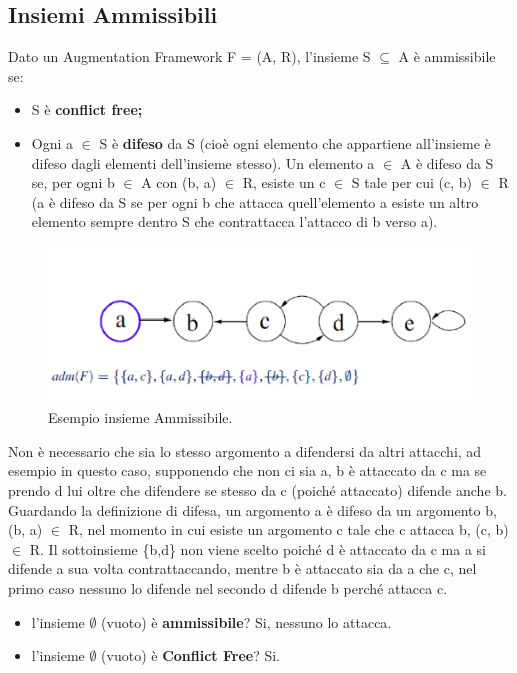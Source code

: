 \subsection{Insiemi Ammissibili}
Dato un Augmentation Framework F = (A, R), l'insieme S $\subseteq$ A è
ammissibile se:
\begin{itemize}
    \item S è \textbf{conflict free;}
    \item Ogni a $\in$ S è \textbf{difeso} da S (cioè ogni elemento che
          appartiene all'insieme è difeso dagli elementi dell'insieme stesso). Un
          elemento a $\in$ A è difeso da S se, per ogni b $\in$ A con (b, a) $\in$ R,
          esiste un c $\in$ S tale per cui (c, b) $\in$ R (a è difeso da S se per ogni
          b che attacca quell'elemento a esiste un altro elemento sempre dentro S che
          contrattacca l'attacco di b verso a).
\end{itemize}

\begin{figure}[H]
    \centering
    \includegraphics[width=12cm, keepaspectratio]{img/Cap6/ammissibile.png}
    \caption{Esempio insieme Ammissibile.}
\end{figure}

Non è necessario che sia lo stesso argomento a difendersi da altri attacchi, ad
esempio in questo caso, supponendo che non ci sia a, b è attaccato da c ma se
prendo d lui oltre che difendere se stesso da c (poiché attaccato) difende anche
b. Guardando la definizione di difesa, un argomento a è difeso da un argomento
b, (b, a) $\in$ R, nel momento in cui esiste un argomento c tale che c attacca
b, (c, b) $\in$ R. Il sottoinsieme \{b,d\} non viene scelto poiché d è attaccato
da c ma a si difende a sua volta contrattaccando, mentre b è attaccato sia da a
che c, nel primo caso nessuno lo difende nel secondo d difende b perché attacca
c.
\begin{itemize}
    \item l'insieme $\emptyset$ (vuoto) è \textbf{ammissibile}? Si, nessuno lo attacca.
    \item l'insieme $\emptyset$ (vuoto) è \textbf{Conflict Free}? Si.
\end{itemize}

